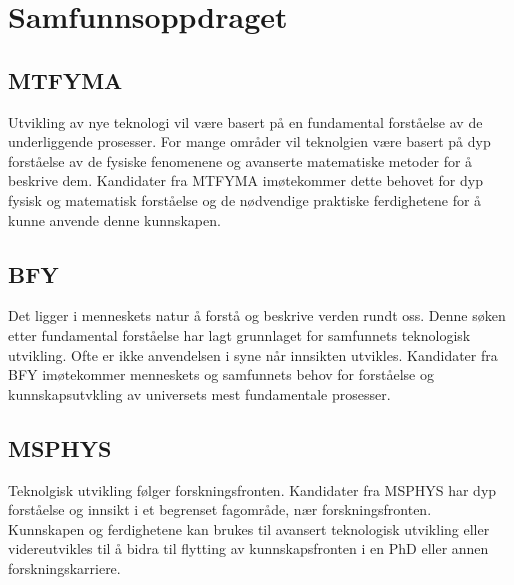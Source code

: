 \chapter{Samfunnsoppdraget}
\label{c:mission}

\section{MTFYMA}
Utvikling av nye teknologi vil være basert på en fundamental forståelse av de underliggende prosesser. For mange områder vil teknolgien være basert på dyp forståelse av de fysiske fenomenene og avanserte matematiske metoder for å beskrive dem. Kandidater fra MTFYMA imøtekommer dette behovet for dyp fysisk og matematisk forståelse og de nødvendige praktiske ferdighetene for å kunne anvende denne kunnskapen.

\section{BFY}
Det ligger i menneskets natur å forstå og beskrive verden rundt oss. Denne søken etter fundamental forståelse har lagt grunnlaget for samfunnets teknologisk utvikling. Ofte er ikke anvendelsen i syne når innsikten utvikles. Kandidater fra BFY imøtekommer menneskets og samfunnets behov for forståelse og kunnskapsutvkling av universets mest fundamentale prosesser.

\section{MSPHYS}
Teknolgisk utvikling følger forskningsfronten. Kandidater fra MSPHYS har dyp forståelse og innsikt i et begrenset fagområde, nær forskningsfronten. Kunnskapen og ferdighetene kan brukes til avansert teknologisk utvikling eller videreutvikles til å bidra til flytting av kunnskapsfronten i en PhD eller annen forskningskarriere.